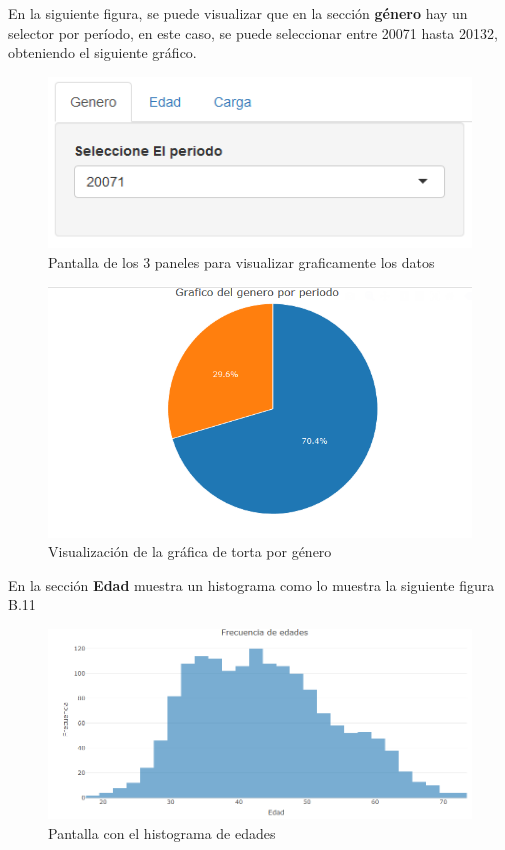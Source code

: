 En la siguiente figura, se puede visualizar que en la secci\'on \textbf{g\'enero} hay un selector por per\'iodo, en este caso, se puede seleccionar entre 20071 hasta 20132, obteniendo el siguiente gr\'afico.

\begin{figure}[H]
\centering
\includegraphics[scale=0.6]{panel.PNG}
\caption{Pantalla de los 3 paneles para visualizar graficamente los datos}
\end{figure}

\begin{figure}[H]
\centering
\includegraphics[scale=0.6]{genero.PNG}
\caption{Visualizaci\'on de la gr\'afica de torta por g\'enero}
\end{figure}

En la secci\'on \textbf{Edad} muestra un histograma como lo muestra la siguiente figura B.11

\begin{figure}[H]
\centering
\includegraphics[scale=0.6]{edad.PNG}
\caption{Pantalla con el histograma de edades}
\end{figure}

